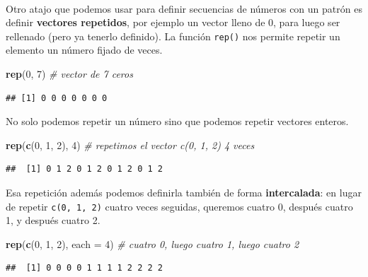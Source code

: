 \documentclass[11pt,]{book}
\newenvironment{Shaded}{\begin{snugshade}}{\end{snugshade}}
\newcommand{\CommentTok}[1]{\textcolor[rgb]{0.37,0.37,0.37}{\textit{#1}}}
\newcommand{\DataTypeTok}[1]{\textcolor[rgb]{0.27,0.27,0.27}{#1}}
\newcommand{\DecValTok}[1]{\textcolor[rgb]{0.06,0.06,0.06}{#1}}
\newcommand{\KeywordTok}[1]{\textcolor[rgb]{0.27,0.27,0.27}{\textbf{#1}}}
\newcommand{\NormalTok}[1]{#1}
\begin{document}
~

Otro atajo que podemos usar para definir secuencias de números con un patrón es definir \textbf{vectores repetidos}, por ejemplo un vector lleno de 0, para luego ser rellenado (pero ya tenerlo definido). La función \texttt{rep()} nos permite repetir un elemento un número fijado de veces.

\begin{Shaded}
\begin{Highlighting}[]
\KeywordTok{rep}\NormalTok{(}\DecValTok{0}\NormalTok{, }\DecValTok{7}\NormalTok{) }\CommentTok{# vector de 7 ceros}
\end{Highlighting}
\end{Shaded}

\begin{verbatim}
## [1] 0 0 0 0 0 0 0
\end{verbatim}

No solo podemos repetir un número sino que podemos repetir vectores enteros.

\begin{Shaded}
\begin{Highlighting}[]
\KeywordTok{rep}\NormalTok{(}\KeywordTok{c}\NormalTok{(}\DecValTok{0}\NormalTok{, }\DecValTok{1}\NormalTok{, }\DecValTok{2}\NormalTok{), }\DecValTok{4}\NormalTok{) }\CommentTok{# repetimos el vector c(0, 1, 2) 4 veces}
\end{Highlighting}
\end{Shaded}

\begin{verbatim}
##  [1] 0 1 2 0 1 2 0 1 2 0 1 2
\end{verbatim}

Esa repetición además podemos definirla también de forma \textbf{intercalada}: en lugar de repetir \texttt{c(0,\ 1,\ 2)} cuatro veces seguidas, queremos cuatro 0, después cuatro 1, y después cuatro 2.

\begin{Shaded}
\begin{Highlighting}[]
\KeywordTok{rep}\NormalTok{(}\KeywordTok{c}\NormalTok{(}\DecValTok{0}\NormalTok{, }\DecValTok{1}\NormalTok{, }\DecValTok{2}\NormalTok{), }\DataTypeTok{each =} \DecValTok{4}\NormalTok{) }\CommentTok{# cuatro 0, luego cuatro 1, luego cuatro 2}
\end{Highlighting}
\end{Shaded}

\begin{verbatim}
##  [1] 0 0 0 0 1 1 1 1 2 2 2 2
\end{verbatim}
\end{document}
